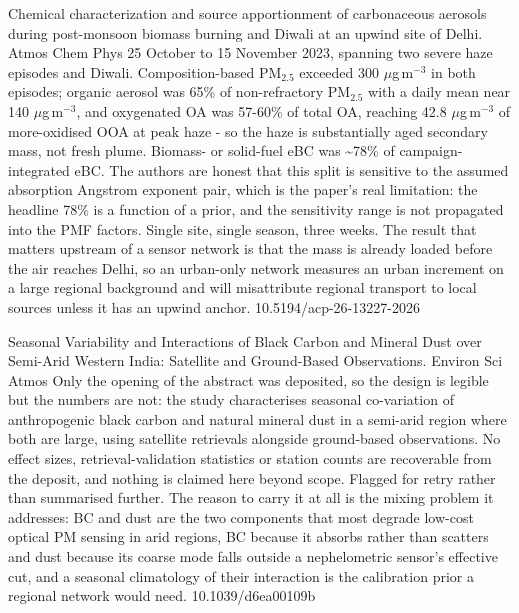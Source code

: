 \documentclass[10pt]{article}
\begin{document}
{Chemical characterization and source apportionment of carbonaceous aerosols during post-monsoon biomass burning and Diwali at an upwind site of Delhi.}
{Atmos Chem Phys}
{25 October to 15 November 2023, spanning two severe haze episodes and Diwali. Composition-based PM$_{2.5}$ exceeded 300 $\mu$g\,m$^{-3}$ in both episodes; organic aerosol was 65\% of non-refractory PM$_{2.5}$ with a daily mean near 140 $\mu$g\,m$^{-3}$, and oxygenated OA was 57-60\% of total OA, reaching 42.8 $\mu$g\,m$^{-3}$ of more-oxidised OOA at peak haze - so the haze is substantially aged secondary mass, not fresh plume. Biomass- or solid-fuel eBC was \textasciitilde{}78\% of campaign-integrated eBC. The authors are honest that this split is sensitive to the assumed absorption Angstrom exponent pair, which is the paper's real limitation: the headline 78\% is a function of a prior, and the sensitivity range is not propagated into the PMF factors. Single site, single season, three weeks. The result that matters upstream of a sensor network is that the mass is already loaded before the air reaches Delhi, so an urban-only network measures an urban increment on a large regional background and will misattribute regional transport to local sources unless it has an upwind anchor.}
{10.5194/acp-26-13227-2026}

{Seasonal Variability and Interactions of Black Carbon and Mineral Dust over Semi-Arid Western India: Satellite and Ground-Based Observations.}
{Environ Sci Atmos}
{Only the opening of the abstract was deposited, so the design is legible but the numbers are not: the study characterises seasonal co-variation of anthropogenic black carbon and natural mineral dust in a semi-arid region where both are large, using satellite retrievals alongside ground-based observations. No effect sizes, retrieval-validation statistics or station counts are recoverable from the deposit, and nothing is claimed here beyond scope. Flagged for retry rather than summarised further. The reason to carry it at all is the mixing problem it addresses: BC and dust are the two components that most degrade low-cost optical PM sensing in arid regions, BC because it absorbs rather than scatters and dust because its coarse mode falls outside a nephelometric sensor's effective cut, and a seasonal climatology of their interaction is the calibration prior a regional network would need.}
{10.1039/d6ea00109b}
\end{document}

